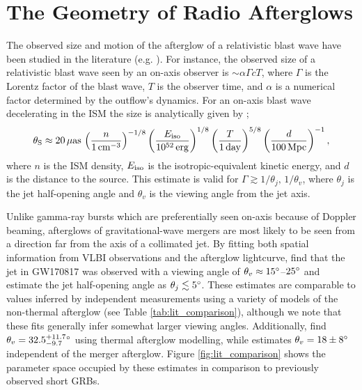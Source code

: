 \section{The Geometry of Radio Afterglows}
\label{sec:geometry_models}
The observed size and motion of the  afterglow of a relativistic blast wave have been studied in the literature (e.g. \citealt{1998ApJ...494L..49S,1999ApJ...513..679G,2018MNRAS.478.4128G,2018Natur.561..355M,2018ApJ...863...58X,2019NatAs...3..940H}). For instance, the observed  size of a relativistic blast wave seen by an on-axis observer is $\sim \alpha \Gamma c T$, where $\Gamma$ is the Lorentz factor of the blast wave, $T$ is the observer time, and $\alpha$ is a numerical factor determined by the outflow's dynamics. For an on-axis blast wave   decelerating in the ISM the size is analytically given by \citet{1998ApJ...494L..49S};
\begin{equation}
\theta_{\rm S} \approx 20\,{\rm \mu as}\,\left(\frac{n}{1\,{\rm cm}^{-3}}\right)^{-1/8}
\left(\frac{E_{\rm iso}}{10^{52}\,{\rm erg}}\right)^{1/8}
\left(\frac{T}{1\,{\rm day}}\right)^{5/8} \left(\frac{d}{100\,{\rm Mpc}}\right)^{-1}, 
\end{equation}
where $n$ is the ISM density, $E_{\rm iso}$ is the isotropic-equivalent kinetic energy,
and $d$ is the distance to the source. This estimate is valid for $\Gamma\gtrsim 1/\theta_j,\,1/\theta_{v}$, where $\theta_j$ is the jet half-opening angle and  $\theta_v$ is the viewing angle from the jet axis.

Unlike gamma-ray bursts which are preferentially seen on-axis because of Doppler beaming, afterglows of gravitational-wave mergers are most likely to be seen from a direction far from the axis of a collimated jet. By fitting both spatial information from VLBI observations and the afterglow lightcurve, \citet{2018Natur.561..355M} find that the jet in GW170817 was observed with a viewing angle of 
$\theta_{v}\approx 15\mbox{$^\circ$}$--$25\mbox{$^\circ$}$ and estimate the jet half-opening angle as 
$\theta_{j}\lesssim 5\mbox{$^\circ$}$. These estimates are comparable to values inferred by independent measurements using a variety of models of the non-thermal afterglow (see Table \ref{tab:lit_comparison}), although we note that these fits generally infer somewhat larger viewing angles. Additionally, \citet{2020ApJ...888...67D} find 
$\theta_v = 32.5_{-9.7}^{+11.7}\mbox{$^\circ$}$ using thermal afterglow modelling, while \citet{2018ApJ...853L..12M} estimates 
$\theta_v = 18\pm 8\mbox{$^\circ$}$ independent of the merger afterglow. Figure \ref{fig:lit_comparison} shows the parameter space occupied by these estimates in comparison to previously observed short GRBs.

